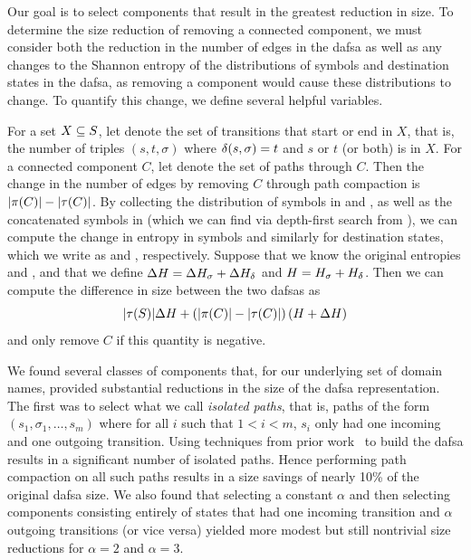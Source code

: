 Our goal is to select components that result in the greatest reduction in size.
To determine the size reduction of removing a connected component, we must
consider both the reduction in the number of edges in the \ac{dafsa} as well as
any changes to the Shannon entropy of the distributions of symbols and
destination states in the \ac{dafsa}, as removing a component would cause these
distributions to change. To quantify this change, we define several helpful
variables.

For a set $X \subseteq S$, let  denote the set of transitions
that start or end in $X$, that is, the number of triples $(s, t, \sigma)$ where
$\delta(s, \sigma) = t$ and $s$ or $t$ (or both) is in $X$. For a connected
component $C$, let  denote the set of paths through $C$. Then the
change in the number of edges by removing $C$ through path compaction is
$|\pi(C)| - |\tau(C)|$. By collecting the distribution of symbols in
 and , as well as the concatenated symbols in
 (which we can find via depth-first search from ), we
can compute the change in entropy in symbols and similarly for destination
states, which we write as \symboldh and \destdh, respectively. Suppose that we know the
original entropies \symbolh and \desth, and that we define $\Delta H = \Delta H_\sigma +
\Delta H_\delta$ and $H = H_\sigma + H_\delta$. Then we can compute the difference in
size between the two \acp{dafsa} as
\begin{equation*}
  |\tau(S)| \Delta H + \left(|\pi(C)| - |\tau(C)|\right)
  (H + \Delta H)
\end{equation*}
and only remove $C$ if this quantity is negative.

We found several classes of components that, for our underlying set of domain
names, provided substantial reductions in the size of the \ac{dafsa}
representation. The first was to select what we call \emph{isolated paths}, that
is, paths of the form $(s_1, \sigma_1, \ldots, s_m)$ where for all $i$ such that
$1 < i < m$, $s_i$ only had one incoming and one outgoing transition. Using
techniques from prior work~\cite{daciuk2000incremental} to build the \ac{dafsa}
results in a significant number of isolated paths. Hence performing path
compaction on all such paths results in a size savings of nearly 10\% of the
original \ac{dafsa} size. We also found that selecting a constant $\alpha$ and
then selecting components consisting entirely of states that had one incoming
transition and $\alpha$ outgoing transitions (or vice versa) yielded more modest
but still nontrivial size reductions for $\alpha = 2$ and $\alpha = 3$.

